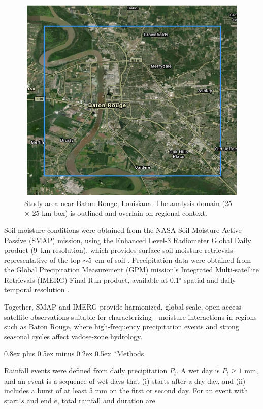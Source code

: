 \documentclass[twocolumn]{article}
\makeatletter
\renewcommand\section{\@startsection{section}{1}{0pt}%
  {0.8ex plus 0.5ex minus 0.2ex}%
  {0.5ex}%
  {\normalfont\large\bfseries}}
\makeatother
\begin{document}
\begin{figure}[!h]
  \centering
  \includegraphics[width=0.95\columnwidth]{map}
  \caption{Study area near Baton Rouge, Louisiana. The analysis domain (25 $\times$ 25 km box) is outlined and overlain on regional context.}
  \label{fig:map}
\end{figure}

Soil moisture conditions were obtained from the NASA Soil Moisture Active Passive (SMAP) mission, using the Enhanced Level-3 Radiometer Global Daily product (9~km resolution), which provides surface soil moisture retrievals representative of the top $\sim$5~cm of soil \cite{smap}. Precipitation data were obtained from the Global Precipitation Measurement (GPM) mission's Integrated Multi-satellite Retrievals (IMERG) Final Run product, available at 0.1$^{\circ}$ spatial and daily temporal resolution \cite{imergdp}.

Together, SMAP and IMERG provide harmonized, global-scale, open-access satellite observations suitable for characterizing - moisture interactions in regions such as Baton Rouge, where high-frequency precipitation events and strong seasonal cycles affect vadose-zone hydrology.

\section*{Methods}

Rainfall events were defined from daily precipitation \(P_t\). A wet day is \(P_t \geq 1\) mm, and an event is a sequence of wet days that (i) starts after a dry day, and (ii) includes a burst of at least 5 mm on the first or second day. For an event with start \(s\) and end \(e\), total rainfall and duration are  
\end{document}
